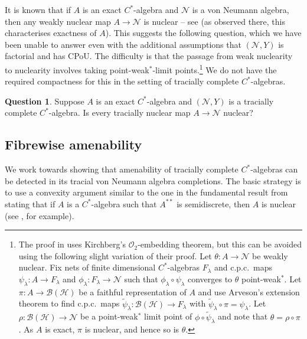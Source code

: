 \documentclass[a4paper,11pt]{amsart}
\theoremstyle{definition}
\newtheorem{question}[theorem]{Question}
\numberwithin{equation}{section}
\numberwithin{theorem}{section}
\begin{document}
It is known that if $A$ is an exact $C^*$-algebra and $\mathcal N$ is a von Neumann algebra, then any weakly nuclear map $A \rightarrow \mathcal N$ is nuclear -- see \cite[Remark~3.4]{HKW12} (as observed there, this characterises exactness of $A$).  This suggests the following question, which we have been unable to answer even with the additional assumptions that $(\mathcal N, Y)$ is factorial and has CPoU.  The difficulty is that the passage from weak nuclearity to nuclearity involves taking point-weak$^*$-limit points.\footnote{The proof in \cite[Remark~3.4]{HKW12} uses Kirchberg's $\mathcal O_2$-embedding theorem, but this can be avoided using the following slight variation of their proof.  Let $\theta \colon A \rightarrow \mathcal N$ be weakly nuclear.  Fix nets of finite dimensional $C^*$-algebras $F_\lambda$ and c.p.c.\ maps $\psi_\lambda \colon A  \rightarrow F_\lambda$ and $\phi_\lambda \colon F_\lambda \rightarrow \mathcal N$ such that $\phi_\lambda \circ \psi_\lambda$ converges to $\theta$ point-weak$^*$.  Let $\pi \colon A \rightarrow \mathcal B(\mathcal H)$ be a faithful representation of $A$ and use Arveson's extension theorem to find c.p.c.\ maps $\widetilde\psi_\lambda \colon \mathcal B(\mathcal H) \rightarrow F_\lambda$ with $\widetilde \psi_\lambda \circ \pi = \psi_\lambda$.  Let $\rho \colon \mathcal B(\mathcal H) \rightarrow \mathcal N$ be a point-weak$^*$ limit point of $\phi \circ \widetilde\psi_\lambda$ and note that $\theta = \rho \circ \pi$.  As $A$ is exact, $\pi$ is nuclear, and hence so is $\theta$.}  We do not have the required compactness for this in the setting of tracially complete $C^*$-algebras.



\begin{question}\label{Q:exact-nuclear}
	Suppose $A$ is an exact $C^*$-algebra and $(\mathcal N, Y)$ is a tracially complete $C^*$-algebra.  Is every tracially nuclear map $A \rightarrow \mathcal N$ nuclear?
\end{question}

\subsection{Fibrewise {}amenability}

We work towards showing that {}amenability of tracially complete $C^*$-algebras can be detected in its tracial von Neumann algebra completions.  The basic strategy is to use a convexity argument similar to the one in the fundamental result from \cite{Effros-Lance77,Choi-Effros76, Choi-Effros77} stating that if $A$ is a $C^*$-algebra such that $A^{**}$ is semidiscrete, then $A$ is nuclear (see \cite[Proposition~2.3.8]{Br08}, for example).  
\end{document}
